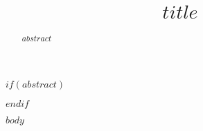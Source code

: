 \documentclass[11pt,a4paper]{cereal/style/ivoa}
\title{$title$}
\author$if(author.url)$[$author.url$]$endif${$author.name$}
\begin{document}
$if(abstract)$
\begin{abstract}
$abstract$
\end{abstract}
$endif$

$body$
\end{document}
